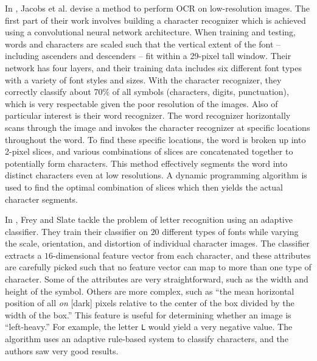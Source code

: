 \documentclass[10pt]{IEEEtran}
\begin{document}
In \cite{1}, Jacobs et al. devise a method to perform OCR on low-resolution images. The first part of their work involves building a character recognizer which is achieved using a convolutional neural network architecture. When training and testing, words and characters are scaled such that the vertical extent of the font -- including ascenders and descenders -- fit within a 29-pixel tall window. Their network has four layers, and their training data includes six different font types with a variety of font styles and sizes. With the character recognizer, they  correctly classify about 70\% of all symbols (characters, digits, punctuation), which is very respectable given the poor resolution of the images. Also of particular interest is their word recognizer. The word recognizer horizontally scans through the image and invokes the character recognizer at specific locations throughout the word. To find these specific locations, the word is broken up into 2-pixel slices, and various combinations of slices are concatenated together to potentially form characters. This method effectively segments the word into distinct characters even at low resolutions. A dynamic programming algorithm is used to find the optimal combination of slices which then yields the actual character segments.

In \cite{2}, Frey and Slate tackle the problem of letter recognition using an adaptive classifier. They train their classifier on $20$ different types of fonts while varying the scale, orientation, and distortion of individual character images. The classifier extracts a $16$-dimensional feature vector from each character, and these attributes are carefully picked such that no feature vector can map to more than one type of character. Some of the attributes are very straightforward, such as the width and height of the symbol. Others are more complex, such as ``the mean horizontal position of all \textit{on} [dark] pixels relative to the center of the box 
divided by the width of the box.'' This feature is useful for determining whether an image is ``left-heavy.'' For example, the letter \texttt{L} would yield a very negative value. The algorithm uses an adaptive rule-based system to classify characters, and the authors saw very good results.
\end{document}
